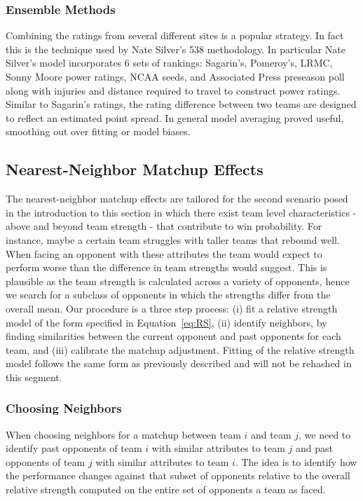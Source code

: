 \subsubsection{Ensemble Methods}
Combining the ratings from several different sites is a popular strategy. In fact this is the technique used by Nate Silver's 538 methodology. In particular Nate Silver's model incorporates 6 sets of rankings: Sagarin's, Pomeroy's, LRMC, Sonny Moore power ratings, NCAA seeds, and Associated Press preseason poll along with injuries and distance required to travel to construct power ratings.   Similar to Sagarin's ratings, the rating difference between two teams are designed to reflect an estimated point spread. In general model averaging proved useful, smoothing out over fitting or model biases.

\subsection{Nearest-Neighbor Matchup Effects}
The nearest-neighbor matchup effects are tailored for the second scenario posed in the introduction to this section in which there exist team level characteristics - above and beyond team strength - that contribute to win probability. For instance, maybe a certain team struggles with taller teams that rebound well. When facing an opponent with these attributes the team would expect to perform worse than the difference in team strengths would suggest. This is plausible as the team strength is calculated across a variety of opponents, hence we search for a subclass of opponents in which the strengths differ from the overall mean. Our procedure is a three step process: (i) fit a relative strength model of the form specified in Equation~\ref{eq:RS}, (ii) identify neighbors, by finding similarities between the current opponent and past opponents for each team, and (iii) calibrate the matchup adjustment. Fitting of the relative strength model follows the same form as previously described and will not be rehashed in this segment.
\subsubsection{Choosing Neighbors}
When choosing neighbors for a matchup between team $i$ and team $j$, we need to identify past opponents of team $i$ with similar attributes to team $j$ and past opponents of team $j$ with similar attributes to team $i.$ The idea is to identify how the performance changes against that subset of opponents relative to the overall relative strength computed on the entire set of opponents a team as faced.

